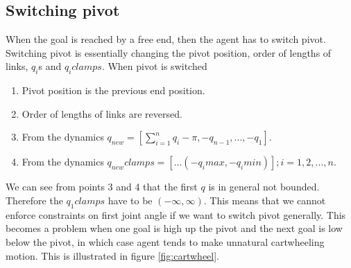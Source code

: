 \documentclass[12pt]{article}
\begin{document}
\subsection{Switching pivot}
When the goal is reached by a free end, then the agent has to switch pivot.
Switching pivot is essentially changing the pivot position, order of lengths of links, $q_i$s and $q_{i}clamps$.
When pivot is switched
\begin{enumerate}[nolistsep]
    \item Pivot position is the previous end position.
    \item Order of lengths of links are reversed.
    \item From the dynamics $q_{new} = [\sum_{i=1}^{n} q_i - \pi, -q_{n-1}, ..., -q_{1}]$.
    \item From the dynamics $q_{new}clamps = [...(-q_imax, -q_imin)]; i = 1, 2, ..., n$.
\end{enumerate}
We can see from points 3 and 4 that the first $q$ is in general not bounded. Therefore the $q_1clamps$ have to be $(-\infty, \infty)$.
This means that we cannot enforce constraints on first joint angle if we want to switch pivot generally.
This becomes a problem when one goal is high up the pivot and the next goal is low below the pivot, in which case agent tends to make unnatural cartwheeling motion.
This is illustrated in figure \ref{fig:cartwheel}.
\end{document}
